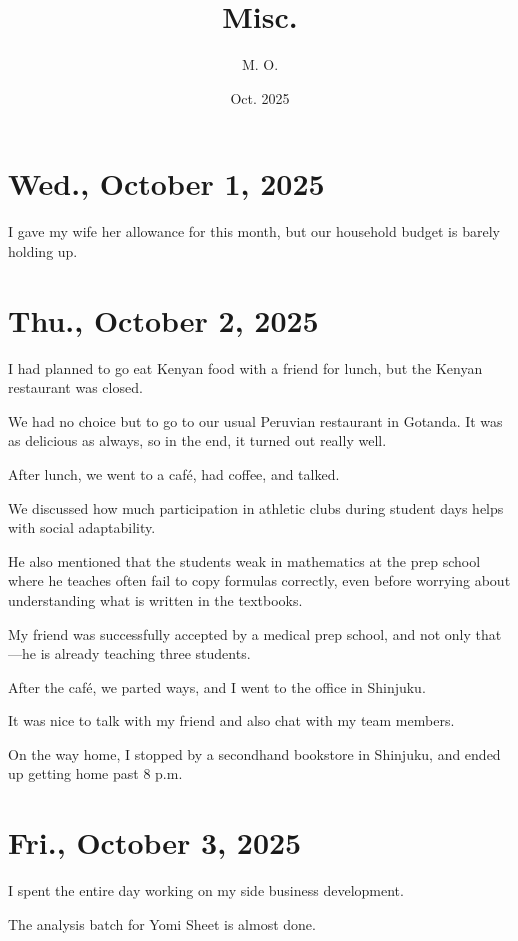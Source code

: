 \documentclass[uplatex]{jsarticle}
\title{
Misc.
}
\author{
M. O.
}
\date{Oct. 2025}
\begin{document}
\maketitle

\section{Wed., October 1, 2025}

I gave my wife her allowance for this month, but our household budget is barely holding up.



\section{Thu., October 2, 2025}

I had planned to go eat Kenyan food with a friend for lunch,  
but the Kenyan restaurant was closed.

We had no choice but to go to our usual Peruvian restaurant in Gotanda.  
It was as delicious as always, so in the end, it turned out really well.

After lunch, we went to a café, had coffee, and talked.

We discussed how much participation in athletic clubs during student days helps with social adaptability.

He also mentioned that the students weak in mathematics at the prep school where he teaches often fail to copy formulas correctly, even before worrying about understanding what is written in the textbooks.

My friend was successfully accepted by a medical prep school,  
and not only that—he is already teaching three students.

After the café, we parted ways, and I went to the office in Shinjuku.

It was nice to talk with my friend and also chat with my team members.

On the way home, I stopped by a secondhand bookstore in Shinjuku,  
and ended up getting home past 8 p.m.



\section{Fri., October 3, 2025}

I spent the entire day working on my side business development.

The analysis batch for Yomi Sheet is almost done.
\end{document}

